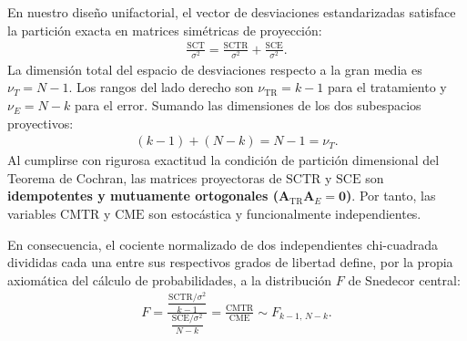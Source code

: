 \begin{solproblema}
\begin{enumerate}
		En nuestro diseño unifactorial, el vector de desviaciones estandarizadas satisface la partición exacta en matrices simétricas de proyección:
		\begin{align}
			\frac{\text{SCT}}{\sigma^2} = \frac{\text{SCTR}}{\sigma^2} + \frac{\text{SCE}}{\sigma^2}.
		\end{align}
		La dimensión total del espacio de desviaciones respecto a la gran media es $\nu_T = N - 1$. Los rangos del lado derecho son $\nu_{\text{TR}} = k - 1$ para el tratamiento y $\nu_E = N - k$ para el error. Sumando las dimensiones de los dos subespacios proyectivos:
		\begin{align}
			(k - 1) + (N - k) = N - 1 = \nu_T.
		\end{align}
		Al cumplirse con rigurosa exactitud la condición de partición dimensional del Teorema de Cochran, las matrices proyectoras de $\text{SCTR}$ y $\text{SCE}$ son \textbf{idempotentes y mutuamente ortogonales ($\mathbf{A}_{\text{TR}} \mathbf{A}_E = \mathbf{0}$)}. Por tanto, las variables $\text{CMTR}$ y $\text{CME}$ son estocástica y funcionalmente independientes.
		
		En consecuencia, el cociente normalizado de dos independientes chi-cuadrada divididas cada una entre sus respectivos grados de libertad define, por la propia axiomática del cálculo de probabilidades, a la distribución $F$ de Snedecor central:
		\begin{align}
			F = \frac{\dfrac{\text{SCTR}/\sigma^2}{k-1}}{\dfrac{\text{SCE}/\sigma^2}{N-k}} = \frac{\text{CMTR}}{\text{CME}} \sim F_{k-1, \, N-k}.
		\end{align}
	\end{enumerate}
\end{solproblema}


